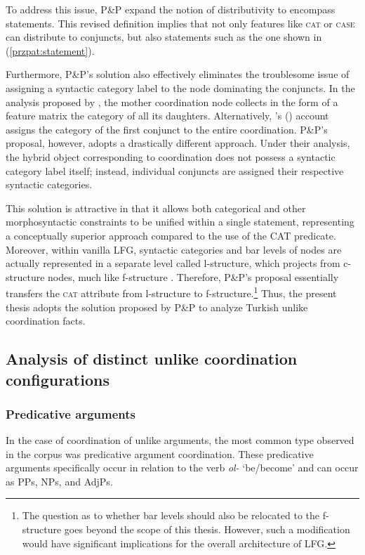 To address this issue, P\&P expand the notion of distributivity to encompass statements. This revised definition implies that not only features like \textsc{cat} or \textsc{case} can distribute to conjuncts, but also statements such as the one shown in (\ref{przpat:statement}). 

Furthermore, P\&P's solution also effectively eliminates the troublesome issue of assigning a syntactic category label to the node dominating the conjuncts. In the analysis proposed by \citeauthor{Dalrymple2017}, the mother coordination node collects in the form of a feature matrix the category of all its daughters. Alternatively, \citeauthor{peterson2004}'s (\citeyear{peterson2004}) account assigns the category of the first conjunct to the entire coordination. P\&P's proposal, however, adopts a drastically different approach. Under their analysis, the hybrid object corresponding to coordination does not possess a syntactic category label itself; instead, individual conjuncts are assigned their respective syntactic categories.

This solution is attractive in that it allows both categorical and other morphosyntactic constraints to be unified within a single statement, representing a conceptually superior approach compared to the use of the CAT predicate. Moreover, within vanilla LFG, syntactic categories and bar levels of nodes are actually represented in a separate level called l-structure, which projects from c-structure nodes, much like f-structure \citep[][p.\ 16]{Lowe_Lovestrand_2020}. Therefore, P\&P's proposal essentially transfers the \textsc{cat} attribute from l-structure to f-structure.\footnote{The question as to whether bar levels should also be relocated to the f-structure goes beyond the scope of this thesis. However, such a modification would have significant implications for the overall architecture of LFG.} Thus, the present thesis adopts the solution proposed by P\&P to analyze Turkish unlike coordination facts.

\subsection{Analysis of distinct unlike coordination configurations}

\subsubsection{Predicative arguments}

In the case of coordination of unlike arguments, the most common type observed in the corpus was predicative argument coordination. These predicative arguments specifically occur in relation to the verb \textit{ol-} `be/become' and can occur as PPs, NPs, and AdjPs.

